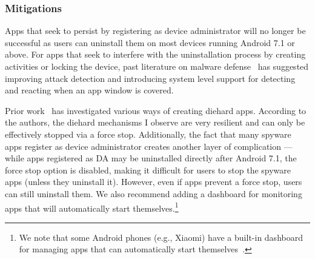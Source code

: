 


\subsubsection{Mitigations}
Apps that seek to persist by registering as device administrator will
no longer be successful as users can uninstall them on most devices
running Android 7.1 or above. For apps that seek to interfere with the
uninstallation process by creating activities or locking the device,
past literature on malware defense~\cite{fernandes2016android,
  aljarrah2016maintaining} has suggested improving attack detection
and introducing system level support for detecting and reacting when
an app window is covered.


Prior work~\cite{zhou2020demystifying} has investigated various ways
of creating diehard apps. According to the authors, the diehard
mechanisms I observe are very resilient and can only be effectively
stopped via a force stop.
Additionally, the fact that many spyware apps register as device administrator
creates another layer of complication --- while apps registered as DA may be
uninstalled directly after Android 7.1, the force stop option is disabled,
making it difficult for users to stop the spyware apps (unless they uninstall
it).
However, even if apps prevent a force stop, users can still uninstall
them.
We also recommend adding a dashboard for monitoring apps that will automatically
start themselves.\footnote{We note that some Android phones (e.g., Xiaomi) have a
built-in dashboard for managing apps that can automatically start
themselves~\cite{HowtoDis42:online}.}

